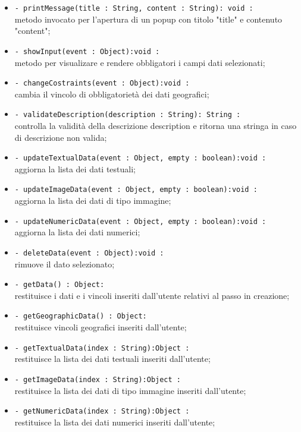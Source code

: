 \begin{flushleft}
\begin{itemize}
\begin{sloppypar}
\begin{itemize}
\item \texttt{- printMessage(title : String, content : String): void :}\\ metodo invocato per l'apertura di un popup con titolo "title" e contenuto "content";
  \item \texttt{- showInput(event : Object):void :}\\ metodo per visualizare e rendere obbligatori i campi dati selezionati;
  \item \texttt{- changeCostraints(event : Object):void :}\\ cambia il vincolo di obbligatorietà dei dati geografici;
  \item \texttt{- validateDescription(description : String): String :}\\ controlla la validità della descrizione description e ritorna una stringa in caso di descrizione non valida;
  \item \texttt{- updateTextualData(event : Object, empty : boolean):void :}\\ aggiorna la lista dei dati testuali;
  \item \texttt{- updateImageData(event : Object, empty : boolean):void :}\\ aggiorna la lista dei dati di tipo immagine;
  \item \texttt{- updateNumericData(event : Object, empty : boolean):void :}\\ aggiorna la lista dei dati numerici;
  \item \texttt{- deleteData(event : Object):void :}\\ rimuove il dato selezionato;
  \item \texttt{- getData() : Object:}\\ restituisce i dati e i vincoli inseriti dall'utente relativi al passo in creazione;
  \item \texttt{- getGeographicData() : Object:}\\ restituisce vincoli geografici inseriti dall'utente;
  \item \texttt{- getTextualData(index : String):Object :}\\ restituisce la lista dei dati testuali inseriti dall'utente;
  \item \texttt{- getImageData(index : String):Object :}\\ restituisce la lista dei dati di tipo immagine inseriti dall'utente;
  \item \texttt{- getNumericData(index : String):Object :}\\ restituisce la lista dei dati numerici inseriti dall'utente;

\end{itemize}
\end{sloppypar}
\end{itemize}
\end{flushleft}
